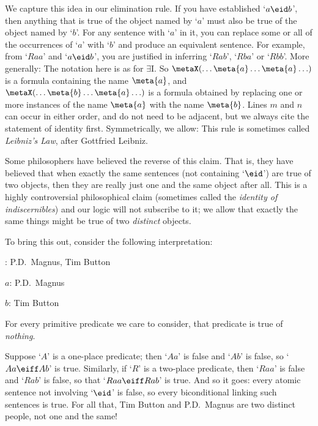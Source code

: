 We capture this idea in our elimination rule. If you have established `$a\eid b$', then anything that is true of the object named by `$a$' must also be true of the object named by `$b$'. For any sentence with `$a$' in it, you can replace some or all of the occurrences of `$a$' with `$b$' and produce an equivalent sentence. For example, from `$Raa$' and `$a \eid  b$', you are justified in inferring `$Rab$', `$Rba$' or `$Rbb$'. More generally:
The notation here is as for $\exists$I. So $\metaX(\ldots \meta{a} \ldots \meta{a}\ldots)$ is a formula containing the name $\meta{a}$, and $\metaX(\ldots \meta{b} \ldots \meta{a}\ldots)$ is a formula obtained by replacing one or more instances of the name $\meta{a}$ with the name $\meta{b}$. Lines $m$ and $n$ can occur in either order, and do not need to be adjacent, but we always cite the statement of identity first. Symmetrically, we allow:
This rule is sometimes called \emph{Leibniz's Law}, after Gottfried Leibniz.

Some philosophers have believed the reverse of this claim. That is, they have believed that when exactly the same sentences (not containing `$\eid $') are true of two objects, then they are really just one and the same object after all. This is a highly controversial philosophical claim (sometimes called the \emph{identity of indiscernibles}) and our logic will not subscribe to it; we allow that exactly the same things might be true of two \emph{distinct} objects.

To bring this out, consider the following interpretation:
	\begin{ebullet}
		\item[\text{domain}:] P.D.\ Magnus, Tim Button
		\item[$a$:] P.D.\ Magnus
		\item[$b$:] Tim Button
		\item For every primitive predicate we care to consider, that predicate is true of \emph{nothing}.
	\end{ebullet}
Suppose `$A$' is a one-place predicate; then `$Aa$' is false and `$Ab$' is false, so `$Aa \eiff Ab$' is true. Similarly, if `$R$' is a two-place predicate, then `$Raa$' is false and `$Rab$' is false, so that `$Raa \eiff Rab$' is true. And so it goes: every atomic sentence not involving `$\eid $' is false, so every biconditional linking such sentences is true. For all that, Tim Button and P.D.\ Magnus are two distinct people, not one and the same!

